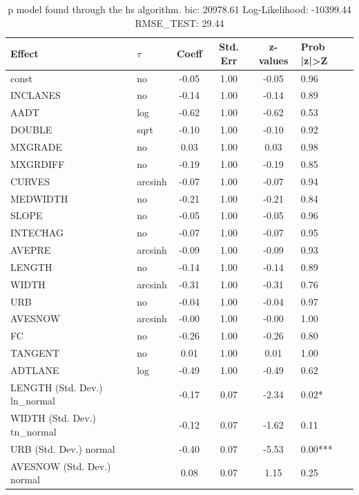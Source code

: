 \begin{table}
	\caption{p model found through the hs algorithm. bic: 20978.61 Log-Likelihood: -10399.44 RMSE_TEST: 29.44}
	\begin{center}
		\begin{tabular}{|l|l|c|c|c|l|}
			\hline
			Effect & $\tau$ & Coeff & Std. Err & z-values & Prob |z|>Z \\
			\hline
			const & no & -0.05 & 1.00 & -0.05 & 0.96 \\
			\hline
			INCLANES & no & -0.14 & 1.00 & -0.14 & 0.89 \\
			\hline
			AADT & log & -0.62 & 1.00 & -0.62 & 0.53 \\
			\hline
			DOUBLE & sqrt & -0.10 & 1.00 & -0.10 & 0.92 \\
			\hline
			MXGRADE & no & 0.03 & 1.00 & 0.03 & 0.98 \\
			\hline
			MXGRDIFF & no & -0.19 & 1.00 & -0.19 & 0.85 \\
			\hline
			CURVES & arcsinh & -0.07 & 1.00 & -0.07 & 0.94 \\
			\hline
			MEDWIDTH & no & -0.21 & 1.00 & -0.21 & 0.84 \\
			\hline
			SLOPE & no & -0.05 & 1.00 & -0.05 & 0.96 \\
			\hline
			INTECHAG & no & -0.07 & 1.00 & -0.07 & 0.95 \\
			\hline
			AVEPRE & arcsinh & -0.09 & 1.00 & -0.09 & 0.93 \\
			\hline
			LENGTH & no & -0.14 & 1.00 & -0.14 & 0.89 \\
			\hline
			WIDTH & arcsinh & -0.31 & 1.00 & -0.31 & 0.76 \\
			\hline
			URB & no & -0.04 & 1.00 & -0.04 & 0.97 \\
			\hline
			AVESNOW & arcsinh & -0.00 & 1.00 & -0.00 & 1.00 \\
			\hline
			FC & no & -0.26 & 1.00 & -0.26 & 0.80 \\
			\hline
			TANGENT & no & 0.01 & 1.00 & 0.01 & 1.00 \\
			\hline
			ADTLANE & log & -0.49 & 1.00 & -0.49 & 0.62 \\
			\hline
			LENGTH (Std. Dev.) ln_normal &  & -0.17 & 0.07 & -2.34 & 0.02* \\
			\hline
			WIDTH (Std. Dev.) tn_normal &  & -0.12 & 0.07 & -1.62 & 0.11 \\
			\hline
			URB (Std. Dev.) normal &  & -0.40 & 0.07 & -5.53 & 0.00*** \\
			\hline
			AVESNOW (Std. Dev.) normal &  & 0.08 & 0.07 & 1.15 & 0.25 \\

\end{tabular}
\end{center}
\end{table}
